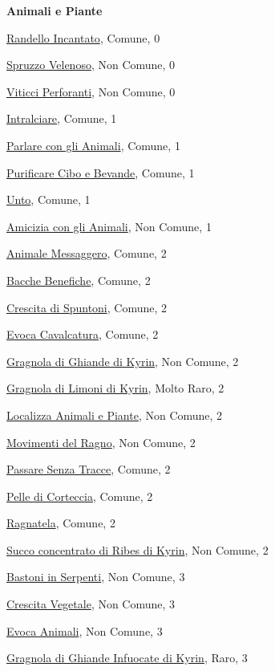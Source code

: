 \begin{multicols}{3}
{{\medskip\textbf{Animali e Piante}

\hyperlink{Randello Incantato}{Randello Incantato}, Comune, 0

\hyperlink{Spruzzo Velenoso}{Spruzzo Velenoso}, Non Comune, 0

\hyperlink{Viticci Perforanti}{Viticci Perforanti}, Non Comune, 0

\hyperlink{Intralciare}{Intralciare}, Comune, 1

\hyperlink{Parlare con gli Animali}{Parlare con gli Animali}, Comune, 1

\hyperlink{Purificare Cibo e Bevande}{Purificare Cibo e Bevande}, Comune, 1

\hyperlink{Unto}{Unto}, Comune, 1

\hyperlink{Amicizia con gli Animali}{Amicizia con gli Animali}, Non Comune, 1

\hyperlink{Animale Messaggero}{Animale Messaggero}, Comune, 2

\hyperlink{Bacche Benefiche}{Bacche Benefiche}, Comune, 2

\hyperlink{Crescita di Spuntoni}{Crescita di Spuntoni}, Comune, 2

\hyperlink{Evoca Cavalcatura}{Evoca Cavalcatura}, Comune, 2

\hyperlink{Gragnola di Ghiande di Kyrin}{Gragnola di Ghiande di Kyrin}, Non Comune, 2

\hyperlink{Gragnola di Limoni di Kyrin}{Gragnola di Limoni di Kyrin}, Molto Raro, 2

\hyperlink{Localizza Animali e Piante}{Localizza Animali e Piante}, Non Comune, 2

\hyperlink{Movimenti del Ragno}{Movimenti del Ragno}, Non Comune, 2

\hyperlink{Passare Senza Tracce}{Passare Senza Tracce}, Comune, 2

\hyperlink{Pelle di Corteccia}{Pelle di Corteccia}, Comune, 2

\hyperlink{Ragnatela}{Ragnatela}, Comune, 2

\hyperlink{Succo concentrato di Ribes di Kyrin}{Succo concentrato di Ribes di Kyrin}, Non Comune, 2

\hyperlink{Bastoni in Serpenti}{Bastoni in Serpenti}, Non Comune, 3

\hyperlink{Crescita Vegetale}{Crescita Vegetale}, Non Comune, 3

\hyperlink{Evoca Animali}{Evoca Animali}, Non Comune, 3

\hyperlink{Gragnola di Ghiande Infuocate di Kyrin}{Gragnola di Ghiande Infuocate di Kyrin}, Raro, 3

}}
\end{multicols}
